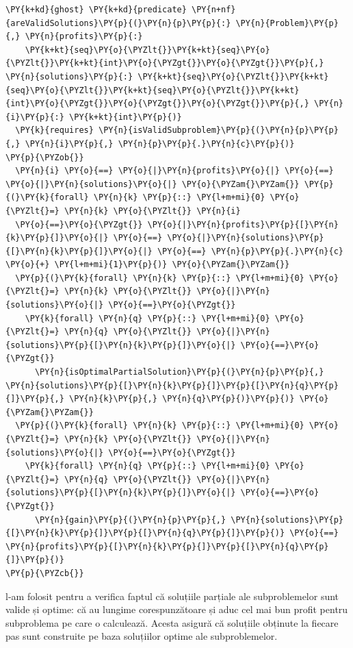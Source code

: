 \begin{sloppypar}
\begin{enumerate}
\begin{Verbatim}[commandchars=\\\{\}]
\PY{k+kd}{ghost} \PY{k+kd}{predicate} \PY{n+nf}{areValidSolutions}\PY{p}{(}\PY{n}{p}\PY{p}{:} \PY{n}{Problem}\PY{p}{,} \PY{n}{profits}\PY{p}{:} 
    \PY{k+kt}{seq}\PY{o}{\PYZlt{}}\PY{k+kt}{seq}\PY{o}{\PYZlt{}}\PY{k+kt}{int}\PY{o}{\PYZgt{}}\PY{o}{\PYZgt{}}\PY{p}{,} \PY{n}{solutions}\PY{p}{:} \PY{k+kt}{seq}\PY{o}{\PYZlt{}}\PY{k+kt}{seq}\PY{o}{\PYZlt{}}\PY{k+kt}{seq}\PY{o}{\PYZlt{}}\PY{k+kt}{int}\PY{o}{\PYZgt{}}\PY{o}{\PYZgt{}}\PY{o}{\PYZgt{}}\PY{p}{,} \PY{n}{i}\PY{p}{:} \PY{k+kt}{int}\PY{p}{)}
  \PY{k}{requires} \PY{n}{isValidSubproblem}\PY{p}{(}\PY{n}{p}\PY{p}{,} \PY{n}{i}\PY{p}{,} \PY{n}{p}\PY{p}{.}\PY{n}{c}\PY{p}{)}
\PY{p}{\PYZob{}} 
  \PY{n}{i} \PY{o}{==} \PY{o}{|}\PY{n}{profits}\PY{o}{|} \PY{o}{==} \PY{o}{|}\PY{n}{solutions}\PY{o}{|} \PY{o}{\PYZam{}\PYZam{}} \PY{p}{(}\PY{k}{forall} \PY{n}{k} \PY{p}{::} \PY{l+m+mi}{0} \PY{o}{\PYZlt{}=} \PY{n}{k} \PY{o}{\PYZlt{}} \PY{n}{i} 
  \PY{o}{==}\PY{o}{\PYZgt{}} \PY{o}{|}\PY{n}{profits}\PY{p}{[}\PY{n}{k}\PY{p}{]}\PY{o}{|} \PY{o}{==} \PY{o}{|}\PY{n}{solutions}\PY{p}{[}\PY{n}{k}\PY{p}{]}\PY{o}{|} \PY{o}{==} \PY{n}{p}\PY{p}{.}\PY{n}{c} \PY{o}{+} \PY{l+m+mi}{1}\PY{p}{)} \PY{o}{\PYZam{}\PYZam{}} 
  \PY{p}{(}\PY{k}{forall} \PY{n}{k} \PY{p}{::} \PY{l+m+mi}{0} \PY{o}{\PYZlt{}=} \PY{n}{k} \PY{o}{\PYZlt{}} \PY{o}{|}\PY{n}{solutions}\PY{o}{|} \PY{o}{==}\PY{o}{\PYZgt{}} 
    \PY{k}{forall} \PY{n}{q} \PY{p}{::} \PY{l+m+mi}{0} \PY{o}{\PYZlt{}=} \PY{n}{q} \PY{o}{\PYZlt{}} \PY{o}{|}\PY{n}{solutions}\PY{p}{[}\PY{n}{k}\PY{p}{]}\PY{o}{|} \PY{o}{==}\PY{o}{\PYZgt{}} 
      \PY{n}{isOptimalPartialSolution}\PY{p}{(}\PY{n}{p}\PY{p}{,} \PY{n}{solutions}\PY{p}{[}\PY{n}{k}\PY{p}{]}\PY{p}{[}\PY{n}{q}\PY{p}{]}\PY{p}{,} \PY{n}{k}\PY{p}{,} \PY{n}{q}\PY{p}{)}\PY{p}{)} \PY{o}{\PYZam{}\PYZam{}} 
  \PY{p}{(}\PY{k}{forall} \PY{n}{k} \PY{p}{::} \PY{l+m+mi}{0} \PY{o}{\PYZlt{}=} \PY{n}{k} \PY{o}{\PYZlt{}} \PY{o}{|}\PY{n}{solutions}\PY{o}{|} \PY{o}{==}\PY{o}{\PYZgt{}} 
    \PY{k}{forall} \PY{n}{q} \PY{p}{::} \PY{l+m+mi}{0} \PY{o}{\PYZlt{}=} \PY{n}{q} \PY{o}{\PYZlt{}} \PY{o}{|}\PY{n}{solutions}\PY{p}{[}\PY{n}{k}\PY{p}{]}\PY{o}{|} \PY{o}{==}\PY{o}{\PYZgt{}} 
      \PY{n}{gain}\PY{p}{(}\PY{n}{p}\PY{p}{,} \PY{n}{solutions}\PY{p}{[}\PY{n}{k}\PY{p}{]}\PY{p}{[}\PY{n}{q}\PY{p}{]}\PY{p}{)} \PY{o}{==} \PY{n}{profits}\PY{p}{[}\PY{n}{k}\PY{p}{]}\PY{p}{[}\PY{n}{q}\PY{p}{]}\PY{p}{)}
\PY{p}{\PYZcb{}}
\end{Verbatim}
    l-am folosit pentru a verifica faptul că soluțiile parțiale ale subproblemelor sunt valide și optime: că au lungime corespunzătoare și aduc cel mai bun profit pentru subproblema pe care o calculează. Acesta asigură că soluțiile obținute la fiecare pas sunt construite pe baza soluțiilor optime ale subproblemelor.
\end{enumerate}


\end{sloppypar}
